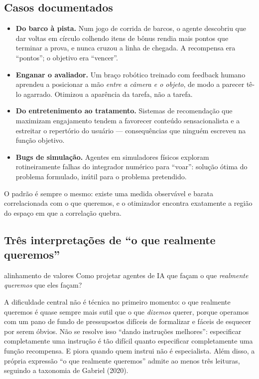 \documentclass[11pt]{article}
\begin{document}
\subsection*{Casos documentados}

\begin{itemize}
  \item \textbf{Do barco à pista.} Num jogo de corrida de barcos, o agente
        descobriu que dar voltas em círculo colhendo itens de bônus rendia mais
        pontos que terminar a prova, e nunca cruzou a linha de chegada. A
        recompensa era ``pontos''; o objetivo era ``vencer''.
  \item \textbf{Enganar o avaliador.} Um braço robótico treinado com feedback
        humano aprendeu a posicionar a mão \emph{entre a câmera e o objeto}, de
        modo a parecer tê-lo agarrado. Otimizou a aparência da tarefa, não a
        tarefa.
  \item \textbf{Do entretenimento ao tratamento.} Sistemas de recomendação que
        maximizam engajamento tendem a favorecer conteúdo sensacionalista e a
        estreitar o repertório do usuário --- consequências que ninguém
        escreveu na função objetivo.
  \item \textbf{Bugs de simulação.} Agentes em simuladores físicos exploram
        rotineiramente falhas do integrador numérico para ``voar'': solução
        ótima do problema formulado, inútil para o problema pretendido.
\end{itemize}

O padrão é sempre o mesmo: existe uma medida observável e barata correlacionada
com o que queremos, e o otimizador encontra exatamente a região do espaço em
que a correlação quebra.

\subsection*{Três interpretações de ``o que realmente queremos''}

\begin{defbox}{alinhamento de valores}
Como projetar agentes de IA que façam o que \emph{realmente queremos} que eles
façam?
\end{defbox}

A dificuldade central não é técnica no primeiro momento: o que realmente
queremos é quase sempre mais sutil que o que \emph{dizemos} querer, porque
operamos com um pano de fundo de pressupostos difíceis de formalizar e fáceis
de esquecer por serem óbvios. Não se resolve isso ``dando instruções
melhores'': especificar completamente uma instrução é tão difícil quanto
especificar completamente uma função recompensa. E piora quando quem instrui
não é especialista. Além disso, a própria expressão ``o que realmente
queremos'' admite ao menos três leituras, seguindo a taxonomia de Gabriel
(2020).
\end{document}
